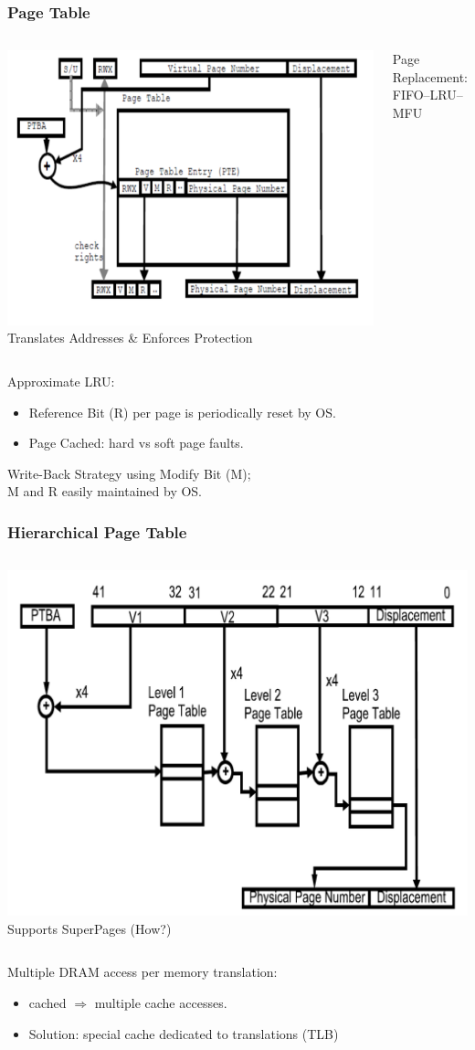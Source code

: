 \documentclass{beamer}
\begin{document}
\begin{frame}[fragile,t]
\frametitle{Page Table}

\begin{columns}
\includegraphics[width=40ex]{FigsMemH/PageTable}
Translates Addresses \& Enforces Protection\smallskip

Page Replacement: FIFO--LRU--MFU
\end{columns}

Approximate LRU:
\begin{itemize}
\item Reference Bit (R) per page is periodically reset by OS.
\item Page Cached: hard vs soft page faults.
\end{itemize}\bigskip

Write-Back Strategy using Modify Bit (M);\\
M and R easily maintained by OS.

\end{frame}


\begin{frame}[fragile,t]
\frametitle{Hierarchical Page Table}

\begin{columns}
\includegraphics[width=40ex]{FigsMemH/HierarchPageTable}
Supports SuperPages (How?)\smallskip


\end{columns}

Multiple DRAM access per memory translation:
\begin{itemize}
\item cached $\Rightarrow$ multiple cache accesses.
\item Solution: special cache dedicated to translations (TLB)
\end{itemize}\bigskip

\end{frame}
\end{document}
